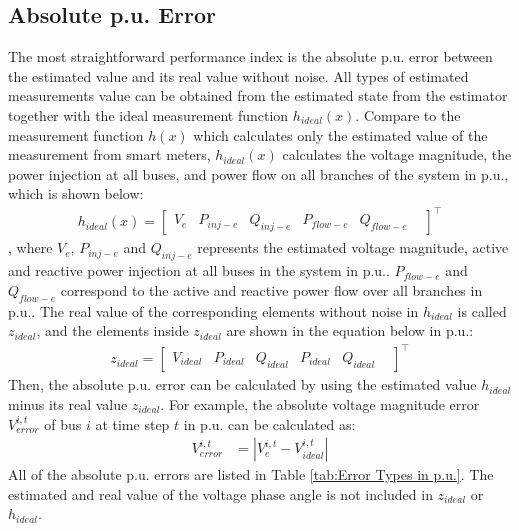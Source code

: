 \subsection{Absolute p.u. Error}
The most straightforward performance index is the absolute p.u. error between the estimated value and its real value without noise. All types of estimated measurements value can be obtained from the estimated state from the estimator together with the ideal measurement function $h_{ideal}(x)$. Compare to the measurement function $h(x)$ which calculates only the estimated value of the measurement from smart meters, $h_{ideal}(x)$ calculates the voltage magnitude, the power injection at all buses, and power flow on all branches of the system in p.u., which is shown below:
    \begin{align}
        h_{ideal}(x)=\begin{bmatrix}
                    V_e &
                    P_{inj-e} &
                    Q_{inj-e} &
                    P_{flow-e} &
                    Q_{flow-e} &
              \end{bmatrix}^\intercal
        \label{eq:ideal measurement jacobian  matrix}  
    \end{align}
, where $V_e$, $P_{inj-e}$ and $Q_{inj-e}$ represents the estimated voltage magnitude, active and reactive power injection at all buses in the system in p.u.. $P_{flow-e}$ and $Q_{flow-e}$ correspond to the active and reactive power flow over all branches in p.u..
The real value of the corresponding elements without noise in $h_{ideal}$ is called $z_{ideal}$, and the elements inside $z_{ideal}$ are shown in the equation below in p.u.:
    \begin{align}
        z_{ideal}=\begin{bmatrix}
                    V_{ideal} &
                    P_{ideal} &
                    Q_{ideal} &
                    P_{ideal} &
                    Q_{ideal} &
              \end{bmatrix}^\intercal
        \label{eq:ideal measurement}  
    \end{align}
Then, the absolute p.u. error can be calculated by using the estimated value $h_{ideal}$ minus its real value $z_{ideal}$. For example, the absolute voltage magnitude error $V_{error}^{i,t}$ of bus $i$ at time step $t$ in p.u. can be calculated as:
\begin{align}
    V_{error}^{i,t} &= |V_e^{i,t}-V_{ideal}^{i,t}|
    \label{eq:Verror}
\end{align}
All of the absolute p.u. errors are listed in Table \ref{tab:Error Types in p.u.}. The estimated and real value of the voltage phase angle is not included in $z_{ideal}$ or $h_{ideal}$.
